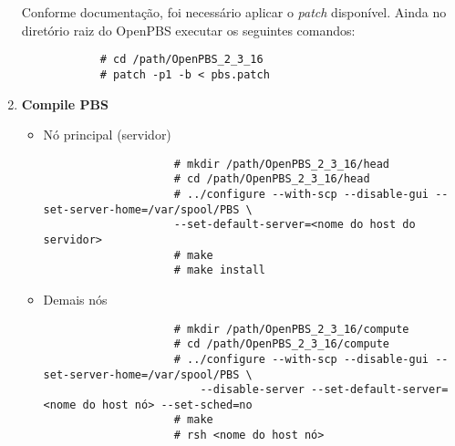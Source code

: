 \begin{enumerate}
		Conforme documentação, foi necessário aplicar o \emph{patch} disponível. Ainda no diretório raiz do OpenPBS executar os seguintes comandos:
		\begin{scriptsize}
		\begin{verbatim}
			# cd /path/OpenPBS_2_3_16
			# patch -p1 -b < pbs.patch
		\end{verbatim}
		\end{scriptsize}
		
	\item \textbf{Compile PBS}
		\begin{itemize}
			\item Nó principal (servidor)
				\begin{scriptsize}
				\begin{verbatim}
					# mkdir /path/OpenPBS_2_3_16/head
					# cd /path/OpenPBS_2_3_16/head
					# ../configure --with-scp --disable-gui --set-server-home=/var/spool/PBS \
					--set-default-server=<nome do host do servidor>
					# make
					# make install
				\end{verbatim}
				\end{scriptsize}
				
			\item Demais nós
				\begin{scriptsize}
				\begin{verbatim}
					# mkdir /path/OpenPBS_2_3_16/compute
					# cd /path/OpenPBS_2_3_16/compute
					# ../configure --with-scp --disable-gui --set-server-home=/var/spool/PBS \
						--disable-server --set-default-server=<nome do host nó> --set-sched=no
					# make
					# rsh <nome do host nó>
				\end{verbatim}
				\end{scriptsize}
		\end{itemize}
		

\end{enumerate}
